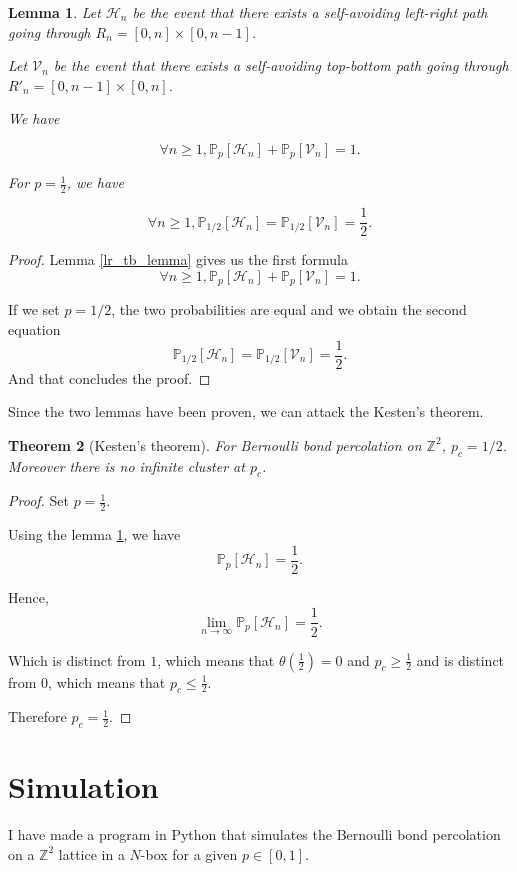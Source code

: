 \documentclass[a4paper,11pt]{article}
\theoremstyle{plain}
\newtheorem{theorem}{Theorem}[section]
\newtheorem{lemma}[theorem]{Lemma}
\theoremstyle{definition}
\theoremstyle{remark}
\begin{document}
\begin{lemma}
\label{Hn1half_lemma}
Let $\mathscr{H}_n$ be the event that there exists a self-avoiding left-right path going through $R_n = [0, n] \times [0, n - 1]$.

Let $\mathscr{V}_n$ be the event that there exists a self-avoiding top-bottom path going through $R'_n = [0, n - 1] \times [0, n]$.

We have

\[ \forall n \geq 1, \mathbb{P}_p[\mathscr{H}_n] + \mathbb{P}_{p}[\mathscr{V}_n] = 1. \]

For $p = \frac{1}{2}$, we have

\[ \forall n \geq 1, \mathbb{P}_{1/2}[\mathscr{H}_n] = \mathbb{P}_{1/2}[\mathscr{V}_n] = \frac{1}{2}. \]
\end{lemma}
\begin{proof}
Lemma \ref{lr_tb_lemma} gives us the first formula
\[ \forall n \geq 1, \mathbb{P}_p[\mathscr{H}_n] + \mathbb{P}_{p}[\mathscr{V}_n] = 1. \]

If we set $p = 1 / 2$, the two probabilities are equal and we obtain the second equation
\[ \mathbb{P}_{1/2}[\mathscr{H}_n] = \mathbb{P}_{1/2}[\mathscr{V}_n] = \frac{1}{2}. \]
And that concludes the proof.
\end{proof}

Since the two lemmas have been proven, we can attack the Kesten's theorem.
\begin{theorem}[Kesten's theorem]
\label{kesten_theorem}
  For Bernoulli bond percolation on $\mathbb{Z}^2$, $p_c=1/2$. Moreover there is no infinite cluster at $p_c$.
\end{theorem}
\begin{proof}
Set $p = \frac{1}{2}$.

Using the lemma \ref{Hn1half_lemma}, we have
\[ \mathbb{P}_p[\mathscr{H}_n] = \frac{1}{2}. \]

Hence,
\[ \lim_{n \rightarrow \infty}{\mathbb{P}_p[\mathscr{H}_n]} = \frac{1}{2}.\]

Which is distinct from $1$, which means that $\theta(\frac{1}{2}) = 0$ and $p_c \geq \frac{1}{2}$ and is distinct from $0$, which means that $p_c \leq \frac{1}{2}$.

Therefore $p_c = \frac{1}{2}$.
\end{proof}

\section{Simulation}
I have made a program in Python that simulates the Bernoulli bond percolation on a $\mathbb{Z}^2$ lattice in a $N$-box for a given $p \in [0,1]$.
\end{document}
